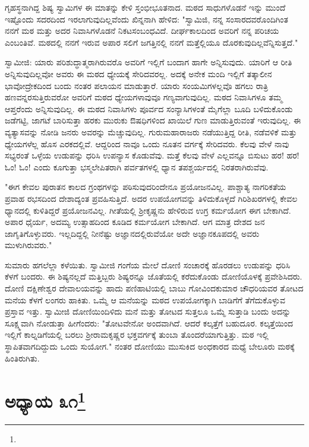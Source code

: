ಗೃಹಸ್ಥನಾಗಿದ್ದ ಶಿಷ್ಯ ಸ್ವಾಮಿಗಳ ಈ ಮಾತನ್ನು ಕೇಳಿ ಸ್ತಂಭೀಭೂತನಾದ. ಮಠದ ಸಾಧುಗಳೊಡನೆ ಇನ್ನು ಮುಂದೆ ಇಷ್ಟೊಂದು ಸದರದಿಂದ ಇರಲಾಗುವುದಿಲ್ಲವೆಂದು ಖಿನ್ನನಾಗಿ ಹೇಳಿದ: "ಸ್ವಾಮಿಜಿ, ನನ್ನ ಸಂಸಾರದವರೊಂದಿಗಿಂತ ನನಗೆ ಮಠ ಮತ್ತು ಅದರ ನಿವಾಸಿಗಳೊಡನೆ ನಿಕಟಸಂಬಂಧವಿದೆ. ದೀರ್ಘಕಾಲದಿಂದ ಅವರಿಗೆ ನನ್ನ ಪರಿಚಯ ಎಂಬಂತಿವೆ. ಮಠದಲ್ಲಿ ನನಗೆ ಇರುವ ಅಪಾರ ಸಲಿಗೆ ಜಗತ್ತಿನಲ್ಲಿ ನನಗೆ ಮತ್ತೆಲ್ಲಿಯೂ ದೊರಕುವುದಿಲ್ಲವೆನ್ನಿಸುತ್ತದೆ."

ಸ್ವಾಮೀಜಿ: ಯಾರು ಪರಿಶುದ್ಧಾತ್ಮರಾಗಿರುವರೊ ಅವರಿಗೆ ಇಲ್ಲಿಗೆ ಬಂದಾಗ ಹಾಗೇ ಅನ್ನಿಸುವುದು. ಯಾರಿಗೆ ಆ ರೀತಿ ಅನ್ನಿಸುವುದಿಲ್ಲವೋ ಅವರು ಈ ಮಠದ ಧ್ಯೇಯಕ್ಕೆ ಸೇರಿದವರಲ್ಲ. ಅದಕ್ಕೆ ಅನೇಕ ಮಂದಿ ಇಲ್ಲಿಗೆ ತತ್ಕಾಲೀನ ಭಾವೋದ್ರೇಕದಿಂದ ಬಂದು ನಂತರ ಪಲಾಯನ ಮಾಡುತ್ತಾರೆ. ಯಾರು ಸಂಯಮಿಗಳಲ್ಲವೊ ಹಗಲು ರಾತ್ರಿ ಹಣವನ್ನರಸುತ್ತಿರುವರೋ ಅವರಿಗೆ ಮಠದ ಧ್ಯೇಯಗಳಾವುವೂ ಗಣ್ಯವಾಗುವುದಿಲ್ಲ. ಮಠದ ನಿವಾಸಿಗಳೂ ತಮ್ಮ ಆಪ್ತರೆಂದು ಅನ್ನಿಸುವುದಿಲ್ಲ. ಈ ಮಠದ ನಿವಾಸಿಗಳು ಪೂರ್ವದ ಸಂನ್ಯಾಸಿಗಳಂತೆ ಮೈಗೆಲ್ಲಾ ಬೂದಿ ಬಳಿದುಕೊಂಡು ಜಡೆಗಟ್ಟಿ, ಜಾಗಟೆ ಬಾರಿಸುತ್ತಾ ಹರಕು ಮುರುಕು ಔಷಧಿಗಳಿಂದ ಖಾಯಿಲೆ ಗುಣ ಮಾಡುತ್ತಿರುವಂತೆ ಇರುವುದಿಲ್ಲ. ಈ ವ್ಯತ್ಯಾಸವನ್ನು ನೋಡಿ ಜನರು ಅವರನ್ನು ಮೆಚ್ಚುವುದಿಲ್ಲ. ಗುರುಮಹಾರಾಜರು ನಡೆಯುತ್ತಿದ್ದ ರೀತಿ, ನಡೆವಳಿಕೆ ಮತ್ತು ಧ್ಯೇಯಗಳೆಲ್ಲ ಹೊಸ ಎರಕದಲ್ಲಿವೆ. ಆದ್ದರಿಂದ ನಾವೂ ಒಂದು ನೂತನ ವರ್ಗಕ್ಕೆ ಸೇರಿದವರು. ಕೆಲವು ವೇಳೆ ನಾವು ಸಭ್ಯರಂತೆ ಒಳ್ಳೆಯ ಉಡುಪನ್ನು ಧರಿಸಿ ಉಪನ್ಯಾಸ ಕೊಡುವೆವು. ಮತ್ತೆ ಕೆಲವು ವೇಳೆ ಎಲ್ಲವನ್ನೂ ಬಿಸುಟು ಹರ! ಹರ! ಓಂ! ಓಂ! ಎಂದು ಕೂಗುತ್ತಾ ಭಸ್ಮಲೇಪಿತರಾಗಿ ಪರ್ವತಗಳಲ್ಲಿ ಧ್ಯಾನ ತಪಶ್ಚರ್ಯದಲ್ಲಿ ನಿರತರಾಗಿರುವೆವು.

"ಈಗ ಕೇವಲ ಪುರಾತನ ಕಾಲದ ಗ್ರಂಥಗಳನ್ನು ಪಠಿಸುವುದರಿಂದೇನೂ ಪ್ರಯೋಜನವಿಲ್ಲ. ಪಾಶ್ಚಾತ್ಯ ನಾಗರಿಕತೆಯ ಪ್ರವಾಹ ರಭಸದಿಂದ ದೇಶಾದ್ಯಂತ ಪ್ರವಹಿಸುತ್ತಿದೆ. ಅದರ ಉಪಯೋಗವನ್ನು ತಿಳಿದುಕೊಳ್ಳದೆ ಗಿರಿಶಿಖರಗಳಲ್ಲಿ ಕೇವಲ ಧ್ಯಾನದಲ್ಲಿ ಕುಳಿತಿದ್ದರೆ ಪ್ರಯೋಜನವಿಲ್ಲ. ಗೀತೆಯಲ್ಲಿ ಶ‍್ರೀಕೃಷ್ಣನು ಹೇಳಿರುವ ಉಗ್ರ ಕರ್ಮಯೋಗ ಈಗ ಬೇಕಾಗಿದೆ. ಅಪಾರ ಧೈರ್ಯ, ಅದಮ್ಯ ಉತ್ಸಾಹದಿಂದ ಕೂಡಿದ ಕರ್ಮಯೋಗ ಬೇಕಾಗಿದೆ. ಆಗ ಮಾತ್ರ ದೇಶದ ಜನ ಜಾಗೃತಿಗೊಳ್ಳುವರು. ಇಲ್ಲದಿದ್ದಲ್ಲಿ ನೀನೆಷ್ಟು ಅಜ್ಞಾನದಲ್ಲಿರುವೆಯೋ ಅದೇ ಅಜ್ಞಾನಕೂಪದಲ್ಲಿ ಅವರು ಮುಳುಗಿರುವರು."

ಸುಮಾರು ಹಗಲೆಲ್ಲಾ ಕಳೆಯಿತು. ಸ್ವಾಮೀಜಿ ಗಂಗೆಯ ಮೇಲೆ ದೋಣಿ ಸಂಚಾರಕ್ಕೆ ಹೊರಡಲು ಉಡುಪನ್ನು ಧರಿಸಿ ಕೆಳಗೆ ಬಂದರು. ಈ ಶಿಷ್ಯನಲ್ಲದೆ ಮತ್ತಿಬ್ಬರು ಶಿಷ್ಯರನ್ನೂ ಜೊತೆಯಲ್ಲಿ ಕರೆದುಕೊಂಡು ದೋಣಿಯೊಳಕ್ಕೆ ಪ್ರವೇಶಿಸಿದರು. ದೋಣಿ ದಕ್ಷಿಣೇಶ್ವರ ದೇವಾಲಯವನ್ನು ಹಾದು ಪಣಿಹಾಟಿಯಲ್ಲಿ ಬಾಬು ಗೋವಿಂದಕುಮಾರ ಚೌಧರಿಯವರ ತೋಟದ ಮನೆಯ ಕೆಳಗೆ ಲಂಗರು ಹಾಕಿತು. ಒಮ್ಮೆ ಆ ಮನೆಯನ್ನು ಮಠದ ಉಪಯೋಗಕ್ಕಾಗಿ ಬಾಡಿಗೆಗೆ ತೆಗೆದುಕೊಳ್ಳುವ ಪ್ರಸ್ತಾವ ಇತ್ತು. ಸ್ವಾಮೀಜಿ ದೋಣಿಯಿಂದಿಳಿದು ಮನೆ ಮತ್ತು ತೋಟದ ಸುತ್ತಲೂ ಒಮ್ಮೆ ಸುತ್ತಾಡಿ ಬಂದು ಅದನ್ನು ಸೂಕ್ಷ್ಮವಾಗಿ ನೋಡುತ್ತಾ ಹೀಗೆಂದರು: "ತೋಟವೇನೋ ಅಂದವಾಗಿದೆ. ಆದರೆ ಕಲ್ಕತ್ತೆಗೆ ಬಹುದೂರ. ಕಲ್ಕತ್ತೆಯಿಂದ ಇಲ್ಲಿಗೆ ಕಾಲ್ನಡಿಗೆಯಲ್ಲಿ ಬರಲು ಶ‍್ರೀರಾಮಕೃಷ್ಣರ ಭಕ್ತವರ್ಗಕ್ಕೆ ತುಂಬಾ ತೊಂದರೆಯಾಗುತ್ತಿತ್ತು. ಮಠ ಇಲ್ಲಿ ಸ್ಥಾಪಿತವಾಗದಿದ್ದುದು ಒಂದು ಸುಯೋಗ." ನಂತರ ದೋಣಿಯು ಮುಸುಕಿದ ಅಂಧಕಾರದ ಮಧ್ಯೆ ಬೇಲೂರು ಮಠಕ್ಕೆ ಹಿಂತಿರುಗಿತು.

\newpage

\chapter[ಅಧ್ಯಾಯ ೩೧]{ಅಧ್ಯಾಯ ೩೧\protect\footnote{}}

